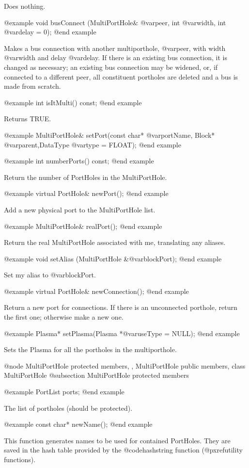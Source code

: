 Does nothing.

@example
void busConnect (MultiPortHole& @var{peer}, int @var{width}, int @var{delay} = 0);
@end example

Makes a bus connection with another multiporthole, @var{peer}, with
width @var{width} and delay @var{delay}.  If there is an existing bus
connection, it is changed as necessary; an existing bus connection may
be widened, or, if connected to a different peer, all constituent
portholes are deleted and a bus is made from scratch.

@example
int isItMulti() const;
@end example

Returns TRUE.

@example
MultiPortHole& setPort(const char* @var{portName},
                       Block* @var{parent},DataType @var{type} = FLOAT);
@end example

@example
int numberPorts() const;
@end example

Return the number of PortHoles in the MultiPortHole.

@example
virtual PortHole& newPort();
@end example

Add a new physical port to the MultiPortHole list.

@example
MultiPortHole& realPort();
@end example

Return the real MultiPortHole associated with me, translating any
aliases.

@example
void setAlias (MultiPortHole &@var{blockPort});
@end example

Set my alias to @var{blockPort}.

@example
virtual PortHole& newConnection();
@end example

Return a new port for connections.  If there is an unconnected porthole,
return the first one; otherwise make a new one.

@example
Plasma* setPlasma(Plasma *@var{useType} = NULL);
@end example

Sets the Plasma for all the portholes in the multiporthole.

@node MultiPortHole protected members,  , MultiPortHole public members, class MultiPortHole
@subsection MultiPortHole protected members

@example
PortList ports;
@end example

The list of portholes (should be protected).

@example
const char* newName();
@end example

This function generates names to be used for contained PortHoles.  They
are saved in the hash table provided by the @code{hashstring} function
(@pxref{utility functions}).

